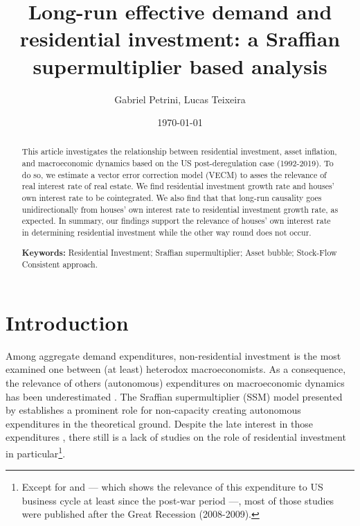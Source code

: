 \documentclass[11pt]{article}
\author{Gabriel Petrini, Lucas Teixeira}
\date{\today}
\title{Long-run effective demand and residential investment: a Sraffian supermultiplier based analysis}
\begin{document}
\maketitle
\begin{abstract}
This article investigates the relationship between residential investment, asset inflation, and macroeconomic dynamics based on
the US post-deregulation case (1992-2019). To do so, we estimate a vector error correction model (VECM) to asses the relevance of
real interest rate of real estate. We find residential investment growth rate and houses’ own interest rate to be cointegrated. We
also find that that long-run causality goes unidirectionally from houses’ own interest rate to residential investment growth rate,
as expected. In summary, our findings support the relevance of houses’ own interest rate in determining residential investment
while the other way round does not occur.

\noindent \textbf{Keywords:} Residential Investment; Sraffian supermultiplier; Asset bubble;  Stock-Flow Consistent approach.
\end{abstract}


\section{Introduction}
\label{sec:org6df620d}
\label{sec:Introduction}
Among aggregate demand expenditures, non-residential investment is the most examined  one between (at least) heterodox macroeconomists.
As a consequence, the relevance of others (autonomous) expenditures on macroeconomic dynamics has been underestimated \cite{brochier_macroeconomics_2017}.
The Sraffian supermultiplier (SSM) model presented by \textcite{serrano_long_1995} establishes a prominent role for non-capacity creating autonomous expenditures in the theoretical ground.
Despite the late interest in those expenditures \cites{freitas_pattern_2013}{girardi_long-run_2016}{girardi_autonomous_2018}{braga_investment_2018}, there still is a lack of studies on the role of residential investment in particular\footnote{Except for \textcite{green_follow_1997} and \textcite{leamer_housing_2007} --- which shows the relevance of this expenditure to US business cycle at least since the post-war period ---, most of those studies were published after the Great Recession (2008-2009).}. 
\end{document}
